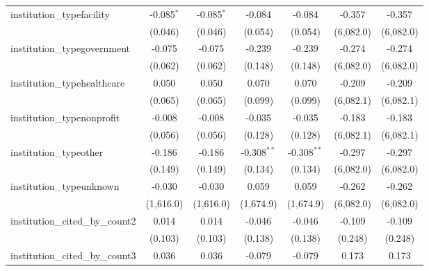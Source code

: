 \begin{tabular}{lcccccc}
   institution\_typefacility             & -0.085$^{*}$   & -0.085$^{*}$   & -0.084        & -0.084        & -0.357       & -0.357\\   
                                         & (0.046)        & (0.046)        & (0.054)       & (0.054)       & (6,082.0)    & (6,082.0)\\   
   institution\_typegovernment           & -0.075         & -0.075         & -0.239        & -0.239        & -0.274       & -0.274\\   
                                         & (0.062)        & (0.062)        & (0.148)       & (0.148)       & (6,082.0)    & (6,082.0)\\   
   institution\_typehealthcare           & 0.050          & 0.050          & 0.070         & 0.070         & -0.209       & -0.209\\   
                                         & (0.065)        & (0.065)        & (0.099)       & (0.099)       & (6,082.1)    & (6,082.1)\\   
   institution\_typenonprofit            & -0.008         & -0.008         & -0.035        & -0.035        & -0.183       & -0.183\\   
                                         & (0.056)        & (0.056)        & (0.128)       & (0.128)       & (6,082.1)    & (6,082.1)\\   
   institution\_typeother                & -0.186         & -0.186         & -0.308$^{**}$ & -0.308$^{**}$ & -0.297       & -0.297\\   
                                         & (0.149)        & (0.149)        & (0.134)       & (0.134)       & (6,082.0)    & (6,082.0)\\   
   institution\_typeunknown              & -0.030         & -0.030         & 0.059         & 0.059         & -0.262       & -0.262\\   
                                         & (1,616.0)      & (1,616.0)      & (1,674.9)     & (1,674.9)     & (6,082.0)    & (6,082.0)\\   
   institution\_cited\_by\_count2        & 0.014          & 0.014          & -0.046        & -0.046        & -0.109       & -0.109\\   
                                         & (0.103)        & (0.103)        & (0.138)       & (0.138)       & (0.248)      & (0.248)\\   
   institution\_cited\_by\_count3        & 0.036          & 0.036          & -0.079        & -0.079        & 0.173        & 0.173\\   

\end{tabular}
